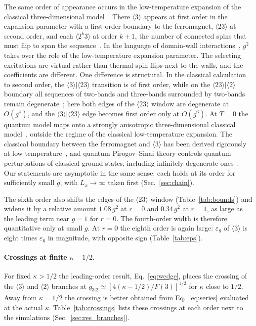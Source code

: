 \documentclass[
 aps,prb,
 twocolumn,
 superscriptaddress,
 longbibliography,
 nofootinbib,
 floatfix
]{revtex4-2}
\begin{document}
The same order of appearance occurs in the low-temperature expansion of the classical three-dimensional
model~\cite{fisher1980infinitely,fisher1981low,selke1988annni}. There $\langle3\rangle$ appears at first order in
the expansion parameter with a first-order boundary to the ferromagnet, $\langle23\rangle$ at second order, and
each $\langle2^k3\rangle$ at order $k+1$, the number of connected spins that must flip to span the
sequence~\cite{yeomans1988theory}. In the language of domain-wall
interactions~\cite{szpilka1986domain,fisher1987domainI,fisher1987domainII}, $g^2$ takes over the role of the
low-temperature expansion parameter. The selecting excitations are virtual rather than thermal spin flips next to
the walls, and the coefficients are different. One difference is structural. In the classical calculation to second order, the
$\langle3\rangle|\langle23\rangle$ transition is of first order, while on the $\langle23\rangle|\langle2\rangle$ boundary all
sequences of two-bands and three-bands surrounded by two-bands remain
degenerate~\cite{fisher1981low}\cite[Sec.~4.2]{selke1988annni}; here both edges of the $\langle23\rangle$ window are
degenerate at $O(g^4)$, and the $\langle3\rangle|\langle23\rangle$ edge becomes first order only at $O(g^6)$. At $T=0$ the
quantum model maps onto a strongly anisotropic three-dimensional classical model~\cite{suzuki1976relationship}, outside
the regime of the classical low-temperature expansion. The classical boundary between the ferromagnet and
$\langle3\rangle$ has been derived rigorously at low temperature~\cite{dinaburg1985analysis}, and quantum Pirogov--Sinai
theory controls quantum perturbations of classical ground states, including infinitely degenerate
ones~\cite{datta1996lowI,datta1996lowII}. Our statements are asymptotic in the same sense: each holds at its order for
sufficiently small $g$, with $L_x\to\infty$ taken first (Sec.~\ref{sec:chain}).

The sixth order also shifts the edges of the $\langle23\rangle$ window (Table~\ref{tab:bounds}) and widens it by a
relative amount $1.08\,g^2$ at $r=0$ and $0.34\,g^2$ at $r=1$, as large as the leading term near $g=1$ for $r=0$. The
fourth-order width is therefore quantitative only at small $g$. At $r=0$ the eighth order is again large: $\varepsilon_8$
of $\langle3\rangle$ is eight times $\varepsilon_6$ in magnitude, with opposite sign (Table~\ref{tab:eps}).

\paragraph*{Crossings at finite $\kappa-1/2$.}
For fixed $\kappa>1/2$ the leading-order result, Eq.~\eqref{eq:wedge}, places the crossing of the
$\langle3\rangle$ and $\langle2\rangle$ branches at $g_{3|2}\simeq[4(\kappa-1/2)/F(3)]^{1/2}$ for $\kappa$
close to $1/2$.
Away from $\kappa=1/2$ the crossing is better obtained from Eq.~\eqref{eq:series} evaluated at the actual $\kappa$.
Table~\ref{tab:crossings} lists these crossings at each order next to the simulations (Sec.~\ref{sec:res_branches}).
\end{document}
